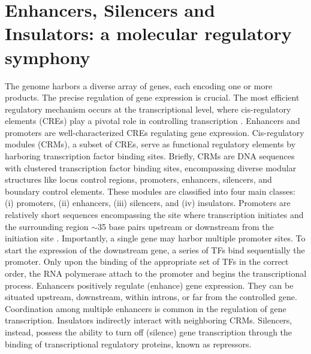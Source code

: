 \documentclass[a4paper, titlepage, openright]{book}
\begin{document}
\section{Enhancers, Silencers and Insulators: a molecular regulatory symphony}
The genome harbors a diverse array of genes, each encoding one or more products. The precise regulation of gene expression is crucial. The most efficient regulatory mechanism occurs at the transcriptional level, where cis-regulatory elements (CREs) play a pivotal role in controlling transcription \citep{wittkopp2012cis}. Enhancers and promoters are well-characterized CREs regulating gene expression. Cis-regulatory modules (CRMs), a subset of CREs, serve as functional regulatory elements by harboring transcription factor binding sites. Briefly, CRMs are DNA sequences with clustered transcription factor binding sites, encompassing diverse modular structures like locus control regions, promoters, enhancers, silencers, and boundary control elements. These modules are classified into four main classes: (i) promoters, (ii) enhancers, (iii) silencers, and (iv) insulators. Promoters are relatively short sequences encompassing the site where transcription initiates and the surrounding region $\sim$35 base pairs upstream or downstream from the initiation site \citep{butler2002rna}. Importantly, a single gene may harbor multiple promoter sites. To start the expression of the downstream gene, a series of TFs bind sequentially the promoter. Only upon the binding of the appropriate set of TFs in the correct order, the RNA polymerase attach to the promoter and begins the transcriptional process. Enhancers positively regulate (enhance) gene expression. They can be situated upstream, downstream, within introns, or far from the controlled gene. Coordination among multiple enhancers is common in the regulation of gene transcription. Insulators indirectly interact with neighboring CRMs. Silencers, instead, possess the ability to turn off (silence) gene transcription through the binding of transcriptional regulatory proteins, known as repressors.

\end{document}
